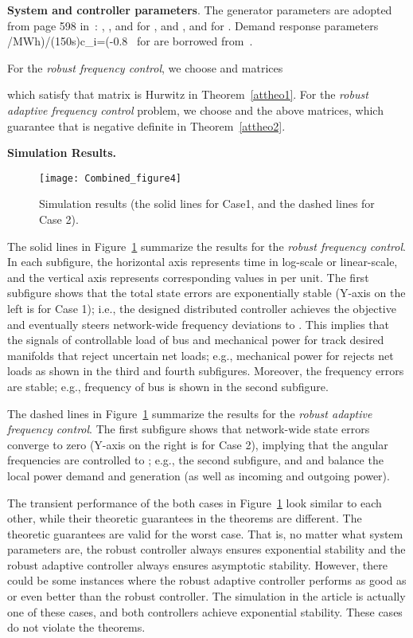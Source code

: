 \documentclass[journal]{IEEEtran}
\begin{document}
\textbf{System and controller parameters}. The generator parameters are adopted from page 598 in~\cite{Kundar.Balu.Lauby:94}:
, ,  and  for , and ,  and  for .
Demand response parameters /MWh)/(150s)c_i=(-0.8 \ for  are borrowed from~\cite{Alvarado.Meng.ea:01}. 

For the \emph{robust frequency control},
we choose  and matrices

which satisfy that matrix  is Hurwitz in Theorem~\ref{attheo1}.
For the \emph{robust adaptive frequency control} problem,
we choose  and the above matrices, which guarantee that  is negative definite in Theorem~\ref{attheo2}.

\textbf{Simulation Results.}
\begin{figure}[t]   \centering   \texttt{[image: Combined\_figure4]}   \caption{
Simulation results (the solid lines for Case1, and the dashed lines for Case 2).}
\label{Combined_figure} \end{figure}
The solid lines in Figure~\ref{Combined_figure} summarize the results for the \emph{robust frequency control}.
In each subfigure, the horizontal axis represents time in log-scale or linear-scale, and the vertical axis represents corresponding values in per unit.
The first subfigure shows that the total state errors  are exponentially stable (Y-axis on the left is for Case 1); i.e., the designed distributed controller achieves the objective and eventually steers network-wide frequency deviations to . 
This implies that the signals of controllable load  of bus  and mechanical power  for  track desired manifolds that reject uncertain net loads; e.g., mechanical power  for  rejects net loads as shown in the third and fourth subfigures.
Moreover, the frequency errors  are stable; e.g., frequency of bus  is shown in the second subfigure.

The dashed lines in Figure~\ref{Combined_figure} summarize the results for the \emph{robust adaptive frequency control}.
The first subfigure shows that network-wide state errors converge to zero (Y-axis on the right is for Case 2), implying that the angular frequencies are controlled to ; e.g., the second subfigure, and  and  balance the local power demand and generation (as well as incoming and outgoing power).


The transient performance of the both cases in Figure~\ref{Combined_figure} look similar to each other, while their theoretic guarantees in the theorems are different.
The theoretic guarantees are valid for the worst case. That is, no matter what system parameters are, the robust controller always ensures exponential stability and the robust adaptive controller always ensures asymptotic stability. However, there could be some instances where the robust adaptive controller performs as good as or even better than the robust controller. The simulation in the article is actually one of these cases, and both controllers achieve exponential stability. These cases do not violate the theorems.
\end{document}
